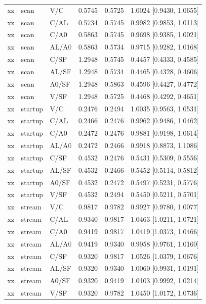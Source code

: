 \begin{longtable}{lllrrl}
xz & scan & V/C & 0.5745 & 0.5725 & 1.0024 [0.9430, 1.0655] \\
xz & scan & C/AL & 0.5734 & 0.5745 & 0.9982 [0.9853, 1.0113] \\
xz & scan & C/A0 & 0.5863 & 0.5745 & 0.9698 [0.9385, 1.0021] \\
xz & scan & AL/A0 & 0.5863 & 0.5734 & 0.9715 [0.9282, 1.0168] \\
xz & scan & C/SF & 1.2948 & 0.5745 & 0.4457 [0.4333, 0.4585] \\
xz & scan & AL/SF & 1.2948 & 0.5734 & 0.4465 [0.4328, 0.4606] \\
xz & scan & A0/SF & 1.2948 & 0.5863 & 0.4596 [0.4427, 0.4772] \\
xz & scan & V/SF & 1.2948 & 0.5725 & 0.4468 [0.4292, 0.4651] \\
xz & startup & V/C & 0.2476 & 0.2494 & 1.0035 [0.9563, 1.0531] \\
xz & startup & C/AL & 0.2466 & 0.2476 & 0.9962 [0.9486, 1.0462] \\
xz & startup & C/A0 & 0.2472 & 0.2476 & 0.9881 [0.9198, 1.0614] \\
xz & startup & AL/A0 & 0.2472 & 0.2466 & 0.9918 [0.8873, 1.1086] \\
xz & startup & C/SF & 0.4532 & 0.2476 & 0.5431 [0.5309, 0.5556] \\
xz & startup & AL/SF & 0.4532 & 0.2466 & 0.5452 [0.5114, 0.5812] \\
xz & startup & A0/SF & 0.4532 & 0.2472 & 0.5497 [0.5231, 0.5776] \\
xz & startup & V/SF & 0.4532 & 0.2494 & 0.5450 [0.5211, 0.5701] \\
xz & stream & V/C & 0.9817 & 0.9782 & 0.9927 [0.9780, 1.0077] \\
xz & stream & C/AL & 0.9340 & 0.9817 & 1.0463 [1.0211, 1.0721] \\
xz & stream & C/A0 & 0.9419 & 0.9817 & 1.0419 [1.0373, 1.0466] \\
xz & stream & AL/A0 & 0.9419 & 0.9340 & 0.9958 [0.9761, 1.0160] \\
xz & stream & C/SF & 0.9320 & 0.9817 & 1.0526 [1.0379, 1.0676] \\
xz & stream & AL/SF & 0.9320 & 0.9340 & 1.0060 [0.9931, 1.0191] \\
xz & stream & A0/SF & 0.9320 & 0.9419 & 1.0103 [0.9992, 1.0214] \\
xz & stream & V/SF & 0.9320 & 0.9782 & 1.0450 [1.0172, 1.0736] \\
\bottomrule\end{longtable}
